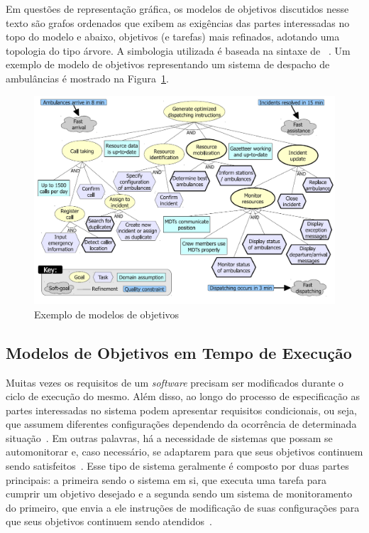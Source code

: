 Em questões de representação gráfica, os modelos de objetivos discutidos nesse texto são grafos ordenados que exibem as exigências das partes interessadas no topo do modelo e abaixo, objetivos (e tarefas) mais refinados, adotando uma topologia do tipo árvore. A simbologia utilizada é baseada na sintaxe de \istar~\cite{yu20111}. Um exemplo de modelo de objetivos representando um sistema de despacho de ambulâncias é mostrado na Figura~\ref{figura-acad-simples}.

\begin{figure}[h]
	\centering
	\includegraphics[width=1\textwidth]{figuras/modelos/ACAD-Simples.png}
	\caption{Exemplo de modelos de objetivos~\cite{tesevitor}}
	\label{figura-acad-simples}
\end{figure}


\subsection{Modelos de Objetivos em Tempo de Execução}
\label{sec-referencial-engenharia-objetivos-runtime}

Muitas vezes os requisitos de um \textit{software} precisam ser modificados durante o ciclo de execução do mesmo. Além disso, ao longo do processo de especificação as partes interessadas no sistema podem apresentar requisitos condicionais, ou seja, que assumem diferentes configurações dependendo da ocorrência de determinada situação~\cite{souza2012requirement}. Em outras palavras, há a necessidade de sistemas que possam se automonitorar e, caso necessário, se adaptarem para que seus objetivos continuem sendo satisfeitos~\cite{dalpiaz2013runtime}. Esse tipo de sistema geralmente é composto por duas partes principais: a primeira sendo o sistema em si, que executa uma tarefa para cumprir um objetivo desejado e a segunda sendo um sistema de monitoramento do primeiro, que envia a ele instruções de modificação de suas configurações para que seus objetivos continuem sendo atendidos~\cite{souza2013awareness}. 

